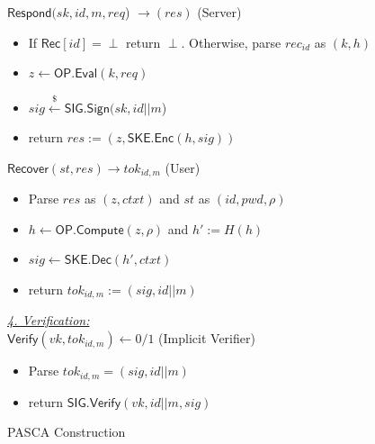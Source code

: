 \documentclass[conference]{IEEEtran}
\newcommand{\sk}{sk}
\newcommand{\vk}{vk}
\newcommand{\uid}{id}
\begin{document}
\begin{figure}
\begin{multicols}{2}

$\mathsf{Respond}(\sk, \uid, m ,req$) $\rightarrow (res)$ \hspace*{\fill} (Server)
\begin{itemize}
    \item If $\mathsf{Rec}[\uid] = \perp$ return $\perp$. Otherwise, parse $rec_{\uid}$ as $(k,h)$
    \item $z \leftarrow \mathsf{OP.Eval}(k, req)$
    \item $sig \xleftarrow{\$} \mathsf{SIG.Sign}(\sk,\uid||m$)
    \item return $res := (z, \mathsf{SKE.Enc}(h,sig))$
\end{itemize}

$\mathsf{Recover}(st,res) \rightarrow tok_{\uid,m}$ \hspace*{\fill} (User)
\begin{itemize}
    \item Parse $res$ as $(z,ctxt)$ and $st$ as $(\uid, pwd, \rho)$
    \item $h \leftarrow \mathsf{OP.Compute}(z,\rho)$ and $h' := H(h)$
    \item $sig \leftarrow \mathsf{SKE.Dec}(h',ctxt)$
    \item return $tok_{\uid,m} := (sig,\uid||m)$
\end{itemize}

\underline{{\em4. Verification:}}\\
$\mathsf{Verify}(vk,tok_{\uid,m}) \leftarrow 0/1$ \hspace*{\fill} (Implicit Verifier)
\begin{itemize}
    \item Parse $tok_{\uid,m} = (sig,\uid||m)$
    \item return $\mathsf{SIG.Verify}(\vk,\uid||m,sig)$ 
\end{itemize}
\end{multicols}
\caption{PASCA Construction}
\label{pasca-construction}
\end{figure}

%
%
\end{document}
